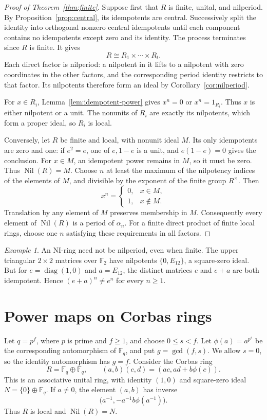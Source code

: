 \documentclass[11pt]{article}
\theoremstyle{remark}
\newtheorem{example}[theorem]{Example}
\DeclareMathOperator{\Nil}{Nil}
\begin{document}
\begin{proof}[Proof of Theorem~\ref{thm:finite}]
Suppose first that $R$ is finite, unital, and nilperiod. By
Proposition~\ref{prop:central}, its idempotents are central.
Successively split the identity into orthogonal nonzero central idempotents
until each component contains no idempotents except zero and its identity.
The process terminates since $R$ is finite. It gives
\[
 R\cong R_1\times\cdots\times R_t.
\]
Each direct factor is nilperiod: a nilpotent in it lifts to a nilpotent
with zero coordinates in the other factors, and the corresponding period
identity restricts to that factor. Its nilpotents therefore form an ideal
by Corollary~\ref{cor:nilperiod}.

For $x\in R_i$, Lemma~\ref{lem:idempotent-power} gives $x^n=0$ or
$x^n=1_{R_i}$. Thus $x$ is either nilpotent or a unit. The nonunits of
$R_i$ are exactly its nilpotents, which form a proper ideal, so $R_i$ is
local.

Conversely, let $R$ be finite and local, with nonunit ideal $M$.
Its only idempotents are zero and one: if $e^2=e$, one of $e,1-e$ is a
unit, and $e(1-e)=0$ gives the conclusion.
For $x\in M$, an idempotent power remains in $M$, so it must be zero.
Thus $\Nil(R)=M$. Choose $n$ at least the maximum of the nilpotency
indices of the elements of $M$, and divisible by the exponent of the
finite group $R^\times$. Then
\[
 x^n=\begin{cases}0,&x\in M,\\1,&x\notin M.\end{cases}
\]
Translation by any element of $M$ preserves membership in $M$.
Consequently every element of $\Nil(R)$ is a period of $\alpha_n$.
For a finite direct product of finite local rings, choose one $n$
satisfying these requirements in all factors.
\end{proof}

\begin{example}
An NI-ring need not be nilperiod, even when finite. The upper triangular
$2\times2$ matrices over $\mathbb F_2$ have nilpotents
$\{0,E_{12}\}$, a square-zero ideal. But for $e=\operatorname{diag}(1,0)$
and $a=E_{12}$, the distinct matrices $e$ and $e+a$ are both idempotent.
Hence $(e+a)^n\ne e^n$ for every $n\geq1$.
\end{example}

\section{Power maps on Corbas rings}
Let $q=p^f$, where $p$ is prime and $f\geq1$, and choose $0\leq s<f$.
Let $\phi(a)=a^{p^s}$ be the corresponding automorphism of $\mathbb F_q$,
and put $g=\gcd(f,s)$. We allow $s=0$, so the identity automorphism has
$g=f$. Consider the Corbas ring
\begin{equation}\label{eq:corbas}
 R=\mathbb F_q\oplus\mathbb F_q,\qquad
 (a,b)(c,d)=(ac,ad+b\phi(c)).
\end{equation}
This is an associative unital ring, with identity $(1,0)$ and square-zero
ideal $N=\{0\}\oplus\mathbb F_q$. If $a\ne0$, the element $(a,b)$ has inverse
\[
 \bigl(a^{-1},-a^{-1}b\phi(a^{-1})\bigr).
\]
Thus $R$ is local and $\Nil(R)=N$.
\end{document}

